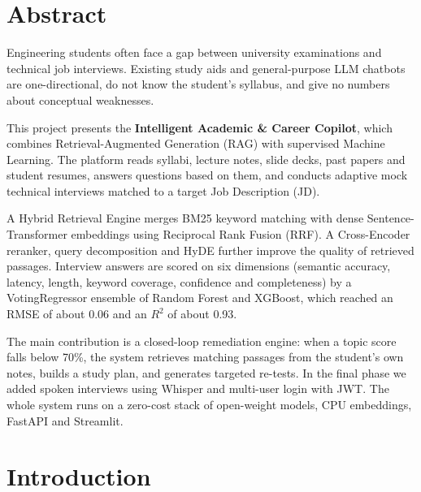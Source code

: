 \documentclass[11pt,a4paper]{report}
\begin{document}
\tableofcontents
\clearpage
\listoftables
\clearpage
\listoffigures
\clearpage

\setcounter{page}{1}

\chapter{Abstract}

Engineering students often face a gap between university examinations and technical job interviews. Existing study aids and general-purpose LLM chatbots are one-directional, do not know the student's syllabus, and give no numbers about conceptual weaknesses.

This project presents the \textbf{Intelligent Academic \& Career Copilot}, which combines Retrieval-Augmented Generation (RAG) with supervised Machine Learning. The platform reads syllabi, lecture notes, slide decks, past papers and student resumes, answers questions based on them, and conducts adaptive mock technical interviews matched to a target Job Description (JD).

A Hybrid Retrieval Engine merges BM25 keyword matching with dense Sentence-Transformer embeddings using Reciprocal Rank Fusion (RRF). A Cross-Encoder reranker, query decomposition and HyDE further improve the quality of retrieved passages. Interview answers are scored on six dimensions (semantic accuracy, latency, length, keyword coverage, confidence and completeness) by a VotingRegressor ensemble of Random Forest and XGBoost, which reached an RMSE of about 0.06 and an $R^2$ of about 0.93.

The main contribution is a closed-loop remediation engine: when a topic score falls below 70\%, the system retrieves matching passages from the student's own notes, builds a study plan, and generates targeted re-tests. In the final phase we added spoken interviews using Whisper and multi-user login with JWT. The whole system runs on a zero-cost stack of open-weight models, CPU embeddings, FastAPI and Streamlit.

\chapter{Introduction}
\end{document}
